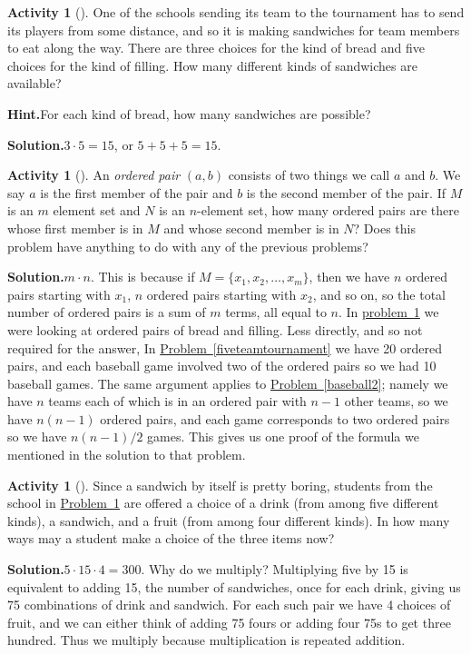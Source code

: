 \documentclass[10pt,]{book}
\theoremstyle{plain}
\theoremstyle{definition}
\newtheorem{activity}[project]{Activity}
\numberwithin{equation}{chapter}
\begin{document}
\begin{activity}[]\label{basicsandwiches}
One of the schools sending its team to the tournament has to send its players from some distance, and so it is making sandwiches for team members to eat along the way. There are three choices for the kind of bread and five choices for the kind of filling. How many different kinds of sandwiches are available?%
\par\medskip\noindent%
\textbf{Hint.}\quad For each kind of bread, how many sandwiches are possible?%
\par\medskip\noindent%
\textbf{Solution.}\quad \(3\cdot5=15\), or \(5+5+5=15\).%
\end{activity}
\begin{activity}[]\label{orderedpair}
An \emph{ordered pair} \((a,b)\) consists of two things we call \(a\) and \(b\). We say \(a\) is the first member of the pair and \(b\) is the second member of the pair. If \(M\) is an \(m\) element set and \(N\) is an \(n\)-element set, how many ordered pairs are there whose first member is in \(M\) and whose second member is in \(N\)? Does this problem have anything to do with any of the previous problems?%
\par\medskip\noindent%
\textbf{Solution.}\quad \(m\cdot n\). This is because if \(M = \{x_1,x_2,\ldots, x_m\}\), then we have \(n\) ordered pairs starting with \(x_1\), \(n\) ordered pairs starting with \(x_2\), and so on, so the total number of ordered pairs is a sum of \(m\) terms, all equal to \(n\). In \hyperref[basicsandwiches]{problem~\ref{basicsandwiches}} we were looking at ordered pairs of bread and filling. Less directly, and so not required for the answer, In \hyperref[fiveteamtournament]{Problem~\ref{fiveteamtournament}} we have 20 ordered pairs, and each baseball game involved two of the ordered pairs so we had 10 baseball games. The same argument applies to \hyperref[baseball2]{Problem~\ref{baseball2}}; namely we have \(n\) teams each of which is in an ordered pair with \(n-1\) other teams, so we have \(n(n-1)\) ordered pairs, and each game corresponds to two ordered pairs so we have \(n(n-1)/2\) games. This gives us one proof of the formula we mentioned in the solution to that problem.%
\end{activity}
\begin{activity}[]\label{completelunch}
Since a sandwich by itself is pretty boring, students from the school in \hyperref[basicsandwiches]{Problem~\ref{basicsandwiches}} are offered a choice of a drink (from among five different kinds), a sandwich, and a fruit (from among four different kinds). In how many ways may a student make a choice of the three items now?%
\par\medskip\noindent%
\textbf{Solution.}\quad \(5\cdot15\cdot4 = 300\). Why do we multiply? Multiplying five by 15 is equivalent to adding 15, the number of sandwiches, once for each drink, giving us 75 combinations of drink and sandwich. For each such pair we have 4 choices of fruit, and we can either think of adding 75 fours or adding four 75s to get three hundred. Thus we multiply because multiplication is repeated addition.%
\end{activity}
\end{document}
